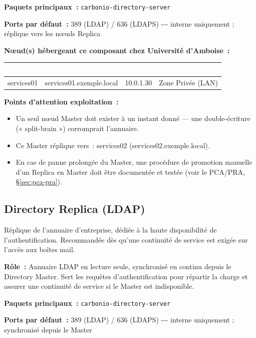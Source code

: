 \documentclass[11pt,a4paper]{report}
\newcommand{\tblhead}[1]{\textcolor{white}{\textbf{#1}}}
\begin{document}
\textbf{Paquets principaux~:} \texttt{carbonio-\allowbreak{}directory-\allowbreak{}server}

\textbf{Ports par défaut~:} 389 (LDAP) / 636 (LDAPS) -\allowbreak{}-\allowbreak{}-\allowbreak{} interne uniquement ; réplique vers les nœuds Replica

\textbf{Nœud(s) hébergeant ce composant chez Université d'Amboise~:}
\begin{longtable}{|p{3.2cm}|p{4.5cm}|p{3.2cm}|p{2.3cm}|}
\hline
\rowcolor{primary}\tblhead{Nœud} & \tblhead{Hostname} & \tblhead{IP} & \tblhead{Zone} \\
\hline
\endhead
services01 & services01.\allowbreak{}exemple.\allowbreak{}local & 10.\allowbreak{}0.\allowbreak{}1.\allowbreak{}30 & Zone Privée (LAN) \\
\hline
\end{longtable}

\textbf{Points d'attention exploitation~:}
\begin{itemize}[nosep]
  \item Un seul nœud Master doit exister à un instant donné --- une double-écriture (« split-brain ») corromprait l'annuaire.
  \item Ce Master réplique vers~: services02 (services02.\allowbreak{}exemple.\allowbreak{}local).
  \item En cas de panne prolongée du Master, une procédure de promotion manuelle d'un Replica en Master doit être documentée et testée (voir le PCA/PRA, \S\ref{sec:pca-pra}).
\end{itemize}

\subsection{Directory Replica (LDAP)}

Réplique de l'annuaire d'entreprise, dédiée à la haute disponibilité de l'authentification.\allowbreak{} Recommandée dès qu'une continuité de service est exigée sur l'accès aux boîtes mail.\allowbreak{}

\textbf{Rôle~:} Annuaire LDAP en lecture seule, synchronisé en continu depuis le Directory Master.\allowbreak{} Sert les requêtes d'authentification pour répartir la charge et assurer une continuité de service si le Master est indisponible.\allowbreak{}


\textbf{Paquets principaux~:} \texttt{carbonio-\allowbreak{}directory-\allowbreak{}server}

\textbf{Ports par défaut~:} 389 (LDAP) / 636 (LDAPS) -\allowbreak{}-\allowbreak{}-\allowbreak{} interne uniquement ; synchronisé depuis le Master
\end{document}
